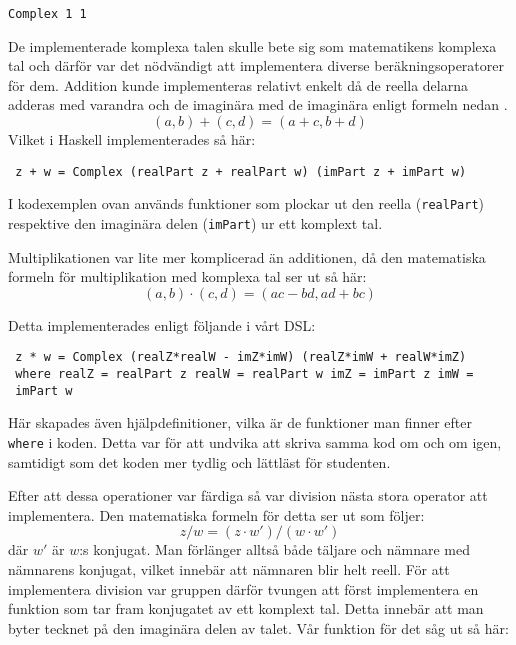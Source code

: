 \documentclass[12pt,a4paper,twoside,openright]{article}
\begin{document}
\begin{verbatim}
Complex 1 1
\end{verbatim}

De implementerade komplexa talen skulle bete sig som matematikens
komplexa tal och därför var det nödvändigt att implementera diverse
beräkningsoperatorer för dem. Addition kunde implementeras relativt
enkelt då de reella delarna adderas med varandra och de imaginära med
de imaginära enligt formeln nedan \cite{conway1978functions}.
\[(a, b) + (c, d) = (a + c, b + d)\]
Vilket i Haskell implementerades så här:
\begin{verbatim}
 z + w = Complex (realPart z + realPart w) (imPart z + imPart w)
\end{verbatim}

I kodexemplen ovan används funktioner som plockar ut den reella
(\texttt{realPart}) respektive den imaginära delen
(\texttt{imPart}) ur ett komplext tal.

Multiplikationen var lite mer komplicerad än additionen, då den
matematiska formeln för multiplikation med komplexa tal ser ut så här:
 \[(a, b) \cdot (c, d) = (ac - bd, ad + bc) \] \cite{conway1978functions}

Detta implementerades enligt följande i vårt DSL:
\begin{verbatim}
 z * w = Complex (realZ*realW - imZ*imW) (realZ*imW + realW*imZ)
 where realZ = realPart z realW = realPart w imZ = imPart z imW =
 imPart w
\end{verbatim}

Här skapades även hjälpdefinitioner, vilka är de funktioner man finner
efter \texttt{where} i koden. Detta var för att undvika
att skriva samma kod om och om igen, samtidigt som det koden mer
tydlig och lättläst för studenten.

Efter att dessa operationer var färdiga så var division nästa stora
operator att implementera. Den matematiska formeln för detta ser ut
som följer:
\[ z / w = (z \cdot w') / (w \cdot w') \]
där $w'$ är $w$:s konjugat.
Man förlänger alltså både täljare och nämnare med nämnarens konjugat,
vilket innebär att nämnaren blir helt reell. För att implementera
division var gruppen därför tvungen att först implementera en funktion
som tar fram konjugatet av ett komplext tal. Detta innebär att man
byter tecknet på den imaginära delen av talet. Vår funktion för det
såg ut så här:
\end{document}
